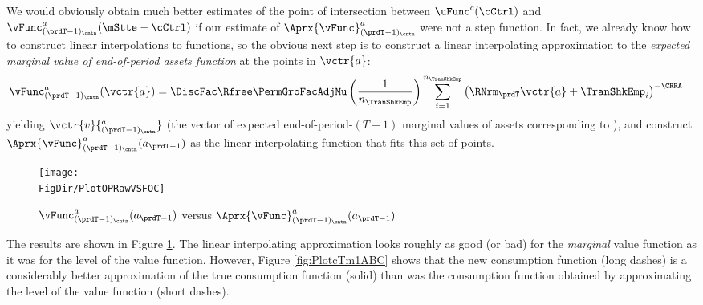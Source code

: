 \documentclass[\econtexRoot/SolvingMicroDSOPs]{subfiles}
\begin{document}
We would obviously obtain much better estimates of the point of intersection between $\uFunc^{c}(\cCtrl)$ and $\vFunc_{({\prdT-1})_\cntn}^{a}(\mStte-\cCtrl)$ if our estimate of $\Aprx{\vFunc}^{a}_{({\prdT-1})_\cntn}$ were not a step function.  In fact, we already know how to construct linear interpolations to functions, so the obvious next step is to construct a linear interpolating approximation to the \textit{expected marginal value of end-of-period assets function} at the points in $\vctr{a}$:
\begin{equation}\begin{gathered}\begin{aligned}
      \vFunc_{({\prdT-1})_\cntn}^{a}(\vctr{a})  & =  \DiscFac \Rfree \PermGroFacAdjMu \left(\frac{1}{n_{\TranShkEmp}}\right) \sum_{i=1}^{n_{\TranShkEmp}} \left(\RNrm_{\prdT} \vctr{a} + \TranShkEmp_{i}\right)^{-\CRRA} \label{eq:vEndPrimeTm1}
    \end{aligned}\end{gathered}\end{equation}
yielding $\vctr{v}{^{a}_{({\prdT-1})_\cntn}}$ (the vector of expected end-of-period-$(T-1)$ marginal values of assets corresponding to ),  %
and construct
$\Aprx{\vFunc}_{({\prdT-1})_\cntn}^{a}(a_{\prdT-1})$ as the linear
interpolating function that fits this set of points.

\hypertarget{PlotOPRawVSFOC}{}
\begin{figure}
  \centerline{\texttt{[image: \\FigDir/PlotOPRawVSFOC]}}
  \caption{$\vFunc_{({\prdT-1})_\cntn}^{a}(a_{\prdT-1})$ versus $\Aprx{\vFunc}_{({\prdT-1})_\cntn}^{a}(a_{\prdT-1})$}
  \label{fig:PlotOPRawVSFOC}
\end{figure}



The results are shown in Figure \ref{fig:PlotOPRawVSFOC}.  The linear interpolating approximation looks roughly as good (or bad) for the \textit{marginal} value function as it was for the level of the value function. However, Figure \ref{fig:PlotcTm1ABC} shows that the new consumption function (long dashes) is a considerably better approximation of the true consumption function (solid) than was the consumption function obtained by approximating the level of the value function (short dashes).
\end{document}
